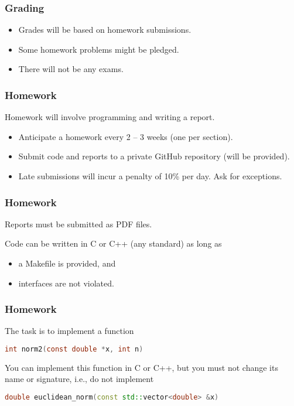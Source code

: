 \documentclass[12pt,t]{beamer}
\let\emph\relax %
\begin{document}
  \begin{frame}
    \frametitle{Grading}

    \begin{itemize}
      \item Grades will be based on homework submissions.
      \item Some homework problems might be pledged.
      \item There will not be any exams.
    \end{itemize}
  \end{frame}

  \begin{frame}
    \frametitle{Homework}

    Homework will involve programming and writing a report.
    \begin{itemize}
      \item Anticipate a homework every 2 -- 3 weeks (one per section).
      \item Submit code and reports to a private GitHub repository (will be provided).
      \item Late submissions will incur a penalty of 10\% per day. Ask \emph{in advance} for exceptions.
    \end{itemize}
  \end{frame}

  \begin{frame}
    \frametitle{Homework}

    Reports must be submitted as PDF files.

    Code can be written in C or C++ (any standard) as long as
    \begin{itemize}
      \item a Makefile is provided, and
      \item interfaces are not violated.
    \end{itemize}
  \end{frame}

  \begin{frame}[fragile]
    \frametitle{Homework}

    \emph{Example 1:} The task is to implement a function
    \begin{lstlisting}[language=c]
      int norm2(const double *x, int n)
    \end{lstlisting}

    You can implement this function in C or C++, but you must not change its name or signature, i.e., do not implement
    \begin{lstlisting}[language=c++]
      double euclidean_norm(const std::vector<double> &x)
    \end{lstlisting}
  \end{frame}
\end{document}
